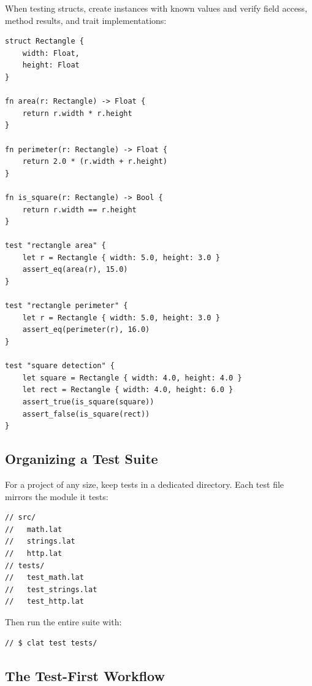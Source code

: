 When testing structs, create instances with known values and verify field access, method results, and trait implementations:

\begin{lstlisting}[language=Lattice, caption={Testing structs}]
struct Rectangle {
    width: Float,
    height: Float
}

fn area(r: Rectangle) -> Float {
    return r.width * r.height
}

fn perimeter(r: Rectangle) -> Float {
    return 2.0 * (r.width + r.height)
}

fn is_square(r: Rectangle) -> Bool {
    return r.width == r.height
}

test "rectangle area" {
    let r = Rectangle { width: 5.0, height: 3.0 }
    assert_eq(area(r), 15.0)
}

test "rectangle perimeter" {
    let r = Rectangle { width: 5.0, height: 3.0 }
    assert_eq(perimeter(r), 16.0)
}

test "square detection" {
    let square = Rectangle { width: 4.0, height: 4.0 }
    let rect = Rectangle { width: 4.0, height: 6.0 }
    assert_true(is_square(square))
    assert_false(is_square(rect))
}
\end{lstlisting}

\subsection{Organizing a Test Suite}\label{sec:organizing-tests}

For a project of any size, keep tests in a dedicated  directory.
Each test file mirrors the module it tests:

\begin{lstlisting}[language=Lattice, caption={Project layout with tests}]
// src/
//   math.lat
//   strings.lat
//   http.lat
// tests/
//   test_math.lat
//   test_strings.lat
//   test_http.lat
\end{lstlisting}

Then run the entire suite with:

\begin{lstlisting}[language=Lattice, caption={Running the full test suite}]
// $ clat test tests/
\end{lstlisting}

\subsection{The Test-First Workflow}\label{sec:test-first}

